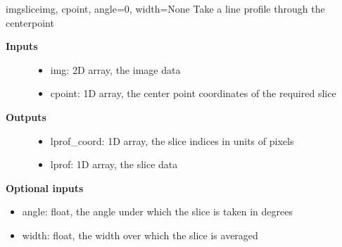 \documentclass[letterpaper,10pt,english]{manual}
\begin{document}
\hypertarget{imageprocess.imgslice}{}\begin{funcdesc}{imgslice}{img, cpoint, angle=0, width=None}
Take a line profile through the centerpoint
\begin{description}
\item[\textbf{Inputs}]\begin{itemize}
\item {} 
img: 2D array, the image data

\item {} 
cpoint: 1D array, the center point coordinates of the required slice

\end{itemize}

\item[\textbf{Outputs}]\begin{itemize}
\item {} 
lprof\_coord: 1D array, the slice indices in units of pixels

\item {} 
lprof: 1D array, the slice data

\end{itemize}

\end{description}

\textbf{Optional inputs}
\begin{itemize}
\item {} 
angle: float, the angle under which the slice is taken in degrees

\item {} 
width: float, the width over which the slice is averaged

\end{itemize}
\end{funcdesc}
\end{document}
